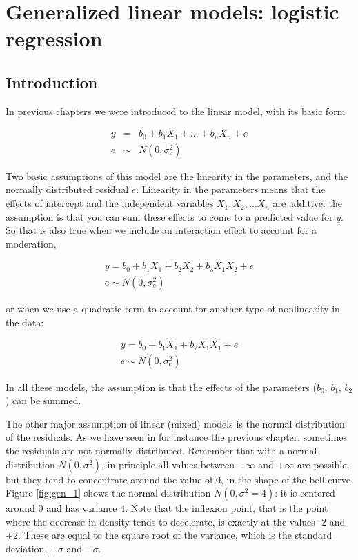 \documentclass[]{book}\usepackage[]{graphicx}\usepackage[]{color}
\begin{document}





\chapter{Generalized linear models: logistic regression}\label{chap:logistic}

\section{Introduction}
In previous chapters we were introduced to the linear model, with its basic form


\begin{eqnarray}
y &=& b_0 + b_1 X_1 + \dots + b_n X_n + e \\
e &\sim& N(0, \sigma_e^2)
\end{eqnarray}

Two basic assumptions of this model are the linearity in the parameters, and the normally distributed residual $e$. Linearity in the parameters means that the effects of intercept and the independent variables $X_1, X_2, \dots X_n$ are additive: the assumption is that you can sum these effects to come to a predicted value for $y$. So that is also true when we include an interaction effect to account for a moderation,

\begin{eqnarray}
y = b_0 + b_1 X_1 + b_2 X_2 + b_3 X_1 X_2 + e \\
e \sim N(0, \sigma_e^2)
\end{eqnarray}


or when we use a quadratic term to account for another type of nonlinearity in the data:


\begin{eqnarray}
y = b_0 + b_1 X_1 +  b_2 X_1 X_1 + e \\
e \sim N(0, \sigma_e^2)
\end{eqnarray}

In all these models, the assumption is that the effects of the parameters ($b_0$, $b_1$, $b_2$) can be summed.

The other major assumption of linear (mixed) models is the normal distribution of the residuals. As we have seen in for instance the previous chapter, sometimes the residuals are not normally distributed. Remember that with a normal distribution $N(0,\sigma^2)$, in principle all values between $-\infty$ and $+\infty$ are possible, but they tend to concentrate around the value of 0, in the shape of the bell-curve. Figure \ref{fig:gen_1} shows the normal distribution $N(0,\sigma^2=4)$: it is centered around 0 and has variance 4. Note that the inflexion point, that is the point where the decrease in density tends to decelerate, is exactly at the values -2 and +2. These are equal to the square root of the variance, which is the standard deviation, $+\sigma$ and $-\sigma$.
\end{document}
